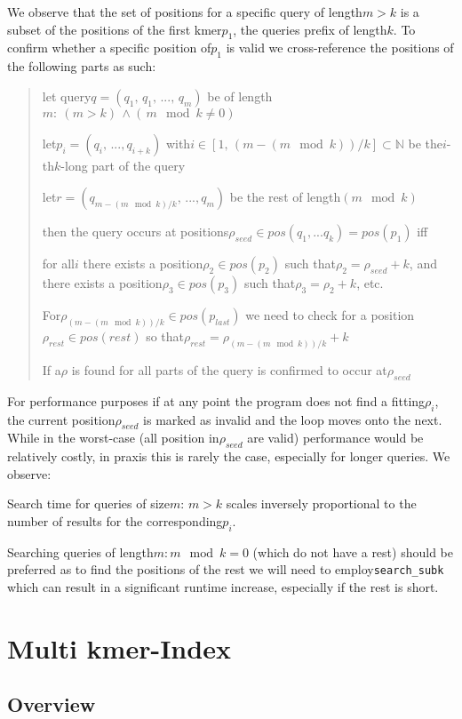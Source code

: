 We observe that the set of positions for a specific query of length$m>k$
is a subset of the positions of the first kmer$p_{1}$, the queries
prefix of length$k$. To confirm whether a specific position of$p_{1}$
is valid we cross-reference the positions of the following parts as
such:
\begin{verse}
let query$q=(q_{1},\,q_{1},\,...,\,q_{m})$ be of length$m:\:(m>k)\,\land(\,m\mod k\neq\text{0})$

let$p_{i}=(q_{i},\,...,q_{i+k})$ with$i\in[1,\,(m-(m\mod k))/k]\subset\mathbb{N}$
be the$i$-th$k$-long part of the query

let$r=(q_{m-(m\mod k)/k},\,...,q_{m})$ be the rest of length$(m\mod k)$

then the query occurs at positions$\rho_{seed}\in pos(q_{1},...q_{k})=pos(p_{1})$
iff

for all$i$ there exists a position$\rho_{2}\in pos(p_{2})$ such
that$\rho_{2}=\rho_{seed}+k$, and there exists a position$\rho_{3}\in pos(p_{3})$
such that$\rho_{3}=\rho_{2}+k$, etc.

For$\rho_{(m-(m\mod k))/k}\in pos(p_{last})$ we need to check for
a position$\rho_{rest}\in pos(rest)$ so that$\rho_{rest}=\rho_{(m-(m\mod k))/k}+k$

If a$\rho$ is found for all parts of the query is confirmed to occur
at$\rho_{seed}$
\end{verse}
For performance purposes if at any point the program does not find
a fitting$\rho_{i}$, the current position$\rho_{seed}$ is marked
as invalid and the loop moves onto the next. While in the worst-case
(all position in$\rho_{seed}$ are valid) performance would be relatively
costly, in praxis this is rarely the case, especially for longer queries.
We observe:
\begin{lem}
\label{Lemma 3}Search time for queries of size$m:\,m>k$ scales inversely
proportional to the number of results for the corresponding$p_{i}$.
\end{lem}
Searching queries of length$m:m\mod k=0$ (which do not have a rest)
should be preferred as to find the positions of the rest we will need
to employ\lstinline{search_subk} which can result in a significant
runtime increase, especially if the rest is short.\pagebreak{}

\section{Multi kmer-Index}

\subsection{\label{subsec: multi k overview}Overview}

